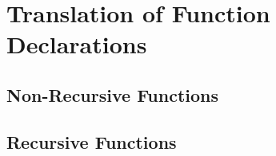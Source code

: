 \section{Translation of Function Declarations} \label{sec:translation:func-decl}

\subsection{Non-Recursive Functions}
\subsection{Recursive Functions}
